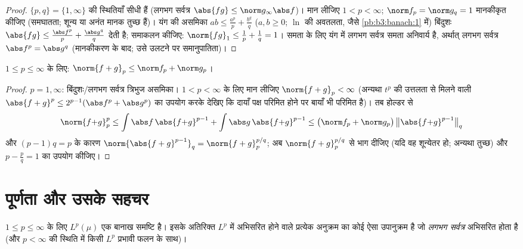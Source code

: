 \begin{proof}
$\{p, q\} = \{1, \infty\}$ की स्थितियाँ सीधी हैं (लगभग सर्वत्र $\abs{fg} \leq
\norm g_\infty\abs f$)। मान लीजिए $1 < p < \infty$;
$\norm f_p = \norm g_q = 1$ मानकीकृत कीजिए (समघातता; शून्य या अनंत मानक तुच्छ हैं)। यंग
की असमिका $ab \leq \frac{a^p}p +
\frac{b^q}q$ ($a, b \geq 0$; $\ln$ की अवतलता, जैसे \cref{pb:b3:banach:1} में) बिंदुशः
$\abs{f g} \leq
\frac{\abs f^p}p + \frac{\abs g^q}q$ देती है; समाकलन कीजिए: $\norm{fg}_1
\leq \frac1p + \frac1q = 1$। समता के लिए यंग में लगभग सर्वत्र
समता अनिवार्य है, अर्थात् लगभग सर्वत्र $\abs f^p = \abs g^q$ (मानकीकरण के बाद;
उसे उलटने पर समानुपातिता)।
\end{proof}

\begin{theorem}[मिन्कोव्स्की की असमिका]\label{thm:b3:lp:minkowski}
$1 \leq p \leq \infty$ के लिए: $\norm{f + g}_p \leq \norm f_p +
\norm g_p$।
\end{theorem}

\begin{proof}
$p = 1, \infty$: बिंदुशः/लगभग सर्वत्र त्रिभुज असमिका। $1 <
p < \infty$ के लिए मान लीजिए
$\norm{f+g}_p < \infty$ (अन्यथा $t^p$ की उत्तलता से मिलने वाली $\abs{f+g}^p \leq 2^{p-1}(\abs f^p + \abs g^p)$ का उपयोग करके
देखिए कि दायाँ पक्ष परिमित होने पर बायाँ भी परिमित है)। तब होल्डर
से
\[
\norm{f{+}g}_p^p \leq \int\abs f\,\abs{f{+}g}^{p-1} +
\int\abs g\,\abs{f{+}g}^{p-1}
\leq \bigl(\norm f_p + \norm g_p\bigr)\,
\bigl\|\abs{f{+}g}^{p-1}\bigr\|_q
\]
और $(p-1)q = p$ के कारण $\norm{\abs{f+g}^{p-1}}_q =
\norm{f+g}_p^{p/q}$; अब $\norm{f+g}_p^{p/q}$ से भाग दीजिए (यदि वह शून्येतर हो;
अन्यथा तुच्छ) और $p -
\frac pq = 1$ का उपयोग कीजिए।
\end{proof}

\section{पूर्णता और उसके सहचर}

\begin{theorem}[रीस--फिशर]\label{thm:b3:lp:complete}
$1 \leq p \leq \infty$ के लिए $L^p(\mu)$ एक बानाख समष्टि है। इसके अतिरिक्त $L^p$ में
अभिसरित होने वाले प्रत्येक अनुक्रम का कोई ऐसा उपानुक्रम है जो
\emph{लगभग सर्वत्र} अभिसरित होता है (और $p < \infty$ की स्थिति में किसी
$L^p$ प्रभावी फलन के साथ)।
\end{theorem}

